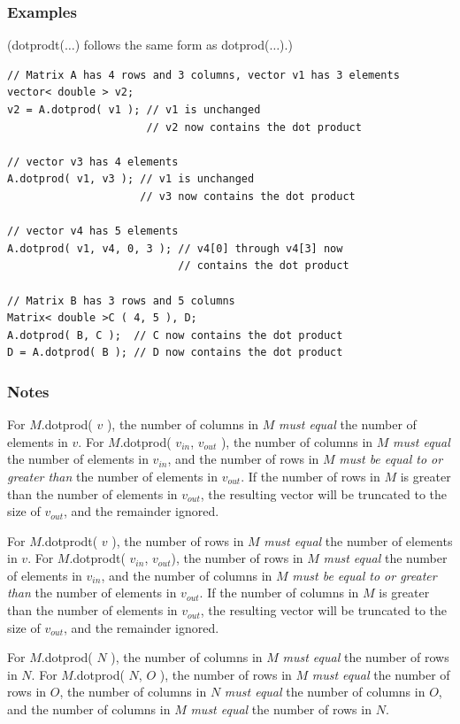 \documentclass{report}
\begin{document}
\subsubsection{Examples}

(dotprodt($\dots$) follows the same form as dotprod($\dots$).)

\begin{verbatim}
// Matrix A has 4 rows and 3 columns, vector v1 has 3 elements
vector< double > v2;
v2 = A.dotprod( v1 ); // v1 is unchanged
                      // v2 now contains the dot product

// vector v3 has 4 elements
A.dotprod( v1, v3 ); // v1 is unchanged
                     // v3 now contains the dot product

// vector v4 has 5 elements
A.dotprod( v1, v4, 0, 3 ); // v4[0] through v4[3] now
                           // contains the dot product

// Matrix B has 3 rows and 5 columns
Matrix< double >C ( 4, 5 ), D;
A.dotprod( B, C );  // C now contains the dot product
D = A.dotprod( B ); // D now contains the dot product
\end{verbatim}

\subsubsection{Notes}
For $M$.dotprod( $v$ ), the number of columns in $M$ {\em must equal}
the number of elements in $v$.  For $M$.dotprod( $v_{in}$, $v_{out}$
), the number of columns in $M$ {\em must equal} the number of
elements in $v_{in}$, and the number of rows in $M$ {\em must be equal
to or greater than} the number of elements in $v_{out}$.  If the
number of rows in $M$ is greater than the number of elements in
$v_{out}$, the resulting vector will be truncated to the size of
$v_{out}$, and the remainder ignored.

For $M$.dotprodt( $v$ ), the number of rows in $M$ {\em must equal}
the number of elements in $v$.  For $M$.dotprodt( $v_{in}$,
$v_{out}$),
the number of rows in $M$ {\em must equal} the number of elements
in $v_{in}$, and the number of columns in $M$ {\em must be equal to or
greater than} the number of elements in $v_{out}$.  If the number of
columns in $M$ is greater than the number of elements in $v_{out}$,
the resulting vector will be truncated to the size of $v_{out}$, and
the remainder ignored.

For $M$.dotprod( $N$ ), the number of columns in $M$ {\em must equal}
the number of rows in $N$.  For $M$.dotprod( $N$, $O$ ), the number of
rows in $M$ {\em must equal} the number of rows in $O$, the number of
columns in $N$ {\em must equal} the number of columns in $O$, and the
number of columns in $M$ {\em must equal} the number of rows in $N$.
\end{document}
